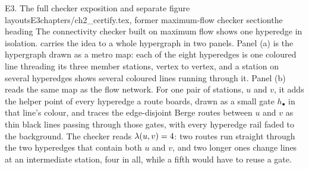\begin{offcut}{E3. The full checker exposition and separate figure layouts}{E3}{chapters/ch2\_certify.tex, former maximum-flow checker section}{the heading The connectivity checker built on maximum flow}
 shows one hyperedge in isolation.  carries the idea to a whole hypergraph in two panels. Panel (a) is the hypergraph drawn as a metro map: each of the eight hyperedges is one coloured line threading its three member stations, vertex to vertex, and a station on several hyperedges shows several coloured lines running through it. Panel (b) reads the same map as the flow network. For one pair of stations, $u$ and $v$, it adds the helper point of every hyperedge a route boards, drawn as a small gate $h_{\bullet}$ in that line's colour, and traces the edge-disjoint Berge routes between $u$ and $v$ as thin black lines passing through those gates, with every hyperedge rail faded to the background. The checker reads $\lambda(u, v) = 4$: two routes run straight through the two hyperedges that contain both $u$ and $v$, and two longer ones change lines at an intermediate station, four in all, while a fifth would have to reuse a gate.


\end{offcut}
